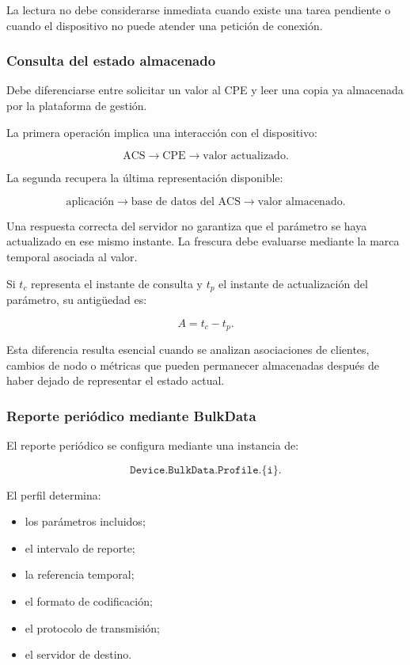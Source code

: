 La lectura no debe considerarse inmediata cuando existe una tarea
pendiente o cuando el dispositivo no puede atender una petición de
conexión.


\subsubsection*{Consulta del estado almacenado}

Debe diferenciarse entre solicitar un valor al CPE y leer una copia ya
almacenada por la plataforma de gestión.

La primera operación implica una interacción con el dispositivo:

\[
    \text{ACS}
    \longrightarrow
    \text{CPE}
    \longrightarrow
    \text{valor actualizado}.
\]

La segunda recupera la última representación disponible:

\[
    \text{aplicación}
    \longrightarrow
    \text{base de datos del ACS}
    \longrightarrow
    \text{valor almacenado}.
\]

Una respuesta correcta del servidor no garantiza que el parámetro se
haya actualizado en ese mismo instante. La frescura debe evaluarse
mediante la marca temporal asociada al valor.

Si \(t_c\) representa el instante de consulta y \(t_p\) el instante de
actualización del parámetro, su antigüedad es:

\[
    A
    =
    t_c
    -
    t_p.
\]

Esta diferencia resulta esencial cuando se analizan asociaciones de
clientes, cambios de nodo o métricas que pueden permanecer almacenadas
después de haber dejado de representar el estado actual.


\subsubsection*{Reporte periódico mediante BulkData}

El reporte periódico se configura mediante una instancia de:

\[
    \texttt{Device.BulkData.Profile.\{i\}.}
\]

El perfil determina:

\begin{itemize}
    \item los parámetros incluidos;
    \item el intervalo de reporte;
    \item la referencia temporal;
    \item el formato de codificación;
    \item el protocolo de transmisión;
    \item el servidor de destino.
\end{itemize}

